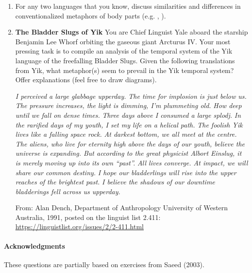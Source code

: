 \documentclass[a4paper]{article}
\begin{document}
\begin{enumerate}
\item For any two languages that you know, discuss similarities and
  differences in conventionalized metaphors of body parts
  (e.g. , ).
\newpage
\item \textbf{The Bladder Slugs of Yik}
  You are Chief Linguist Yale aboard the starship Benjamin Lee Whorf
  orbiting the gaseous giant Arcturus IV. Your most pressing task is
  to compile an analysis of the temporal system of the Yik language of
  the freefalling Bladder Slugs. Given the following translations from
  Yik, what metaphor(s) seem to prevail in the Yik temporal system?
  Offer explanations (feel free to draw diagrams).
  \begin{exe}
    \ex \textit{I perceived a large glabbage upperday.}
    \ex \textit{The time for implosion is just below us. }
    \ex \textit{The pressure increases, the light is dimming, I'm plummeting old.}
    \ex \textit{How deep until we fall on dense times.}
    \ex \textit{Three days above I consumed a large splodj.}
    \ex \textit{In the rarified days of my youth, I set my life on a helical path.}
    \ex \textit{The foolish Yik lives like a falling space rock.}
    \ex \textit{At darkest bottom, we all meet at the centre.}
    \ex \textit{The aliens, who live for eternity high above the days of our youth, believe the universe is expanding. But according to the great physicist Albort Einslug, it is merely moving up into its own ``past''.}
    \ex \textit{All lives converge. At impact, we will share our common destiny.}
    \ex \textit{I hope our bladderlings will rise into the upper reaches of the brightest past.}
    \ex \textit{I believe the shadows of our downtime bladderings fell across us upperday.}
  \end{exe}
From:  Alan Dench, Department of Anthropology University of Western
Australia, 1991, posted on the linguist list 2.411: \url{https://linguistlist.org/issues/2/2-411.html}
\end{enumerate}

\vfill
\paragraph{Acknowledgments} These questions are partially
based on exercises from Saeed (2003).
\end{document}
